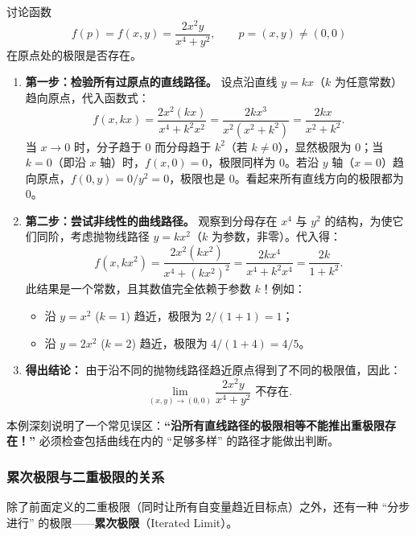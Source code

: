 \documentclass[lang=cn,11pt]{elegantbook}
\begin{document}
\begin{exercise}[直线路径一致但曲线路径不一致] \label{ex:limit-path-curve}
讨论函数
\[
f(p)=f(x,y)=\frac{2x^2y}{x^4+y^2},\qquad p=(x,y) \neq (0,0)
\]
在原点处的极限是否存在。
\end{exercise}

\begin{solution}
\begin{enumerate}
  \item \textbf{第一步：检验所有过原点的直线路径。}
  设点沿直线 $y=kx$（$k$ 为任意常数）趋向原点，代入函数式：
  \[
  f(x,kx)=\frac{2x^2(kx)}{x^4+k^2x^2}=\frac{2kx^3}{x^2(x^2+k^2)}=\frac{2kx}{x^2+k^2}.
  \]
  当 $x\to 0$ 时，分子趋于 0 而分母趋于 $k^2$（若 $k \neq 0$），显然极限为 $0$；当 $k=0$（即沿 $x$ 轴）时，$f(x,0)=0$，极限同样为 $0$。若沿 $y$ 轴（$x=0$）趋向原点，$f(0,y)=0/y^2=0$，极限也是 $0$。看起来所有直线方向的极限都为 0。

  \item \textbf{第二步：尝试非线性的曲线路径。}
  观察到分母存在 $x^4$ 与 $y^2$ 的结构，为使它们同阶，考虑抛物线路径 $y=kx^2$（$k$ 为参数，非零）。代入得：
  \[
  f(x,kx^2)=\frac{2x^2(kx^2)}{x^4+(kx^2)^2}=\frac{2kx^4}{x^4+k^2x^4}=\frac{2k}{1+k^2}.
  \]
  此结果是一个常数，且其数值完全依赖于参数 $k$！例如：
  \begin{itemize}
    \item 沿 $y=x^2$ ($k=1$) 趋近，极限为 $2/(1+1) = 1$；
    \item 沿 $y=2x^2$ ($k=2$) 趋近，极限为 $4/(1+4) = 4/5$。
  \end{itemize}

  \item \textbf{得出结论：}
  由于沿不同的抛物线路径趋近原点得到了不同的极限值，因此：
  \[
  \boxed{\lim_{(x,y)\to(0,0)}\frac{2x^2y}{x^4+y^2}\text{ 不存在}}.
  \]
\end{enumerate}
\begin{note}
本例深刻说明了一个常见误区：\textbf{``沿所有直线路径的极限相等不能推出重极限存在！''} 必须检查包括曲线在内的 ``足够多样'' 的路径才能做出判断。
\end{note}
\end{solution}


\subsubsection{累次极限与二重极限的关系}

除了前面定义的二重极限（同时让所有自变量趋近目标点）之外，还有一种 ``分步进行'' 的极限——\textbf{累次极限}（Iterated Limit）。
\end{document}
